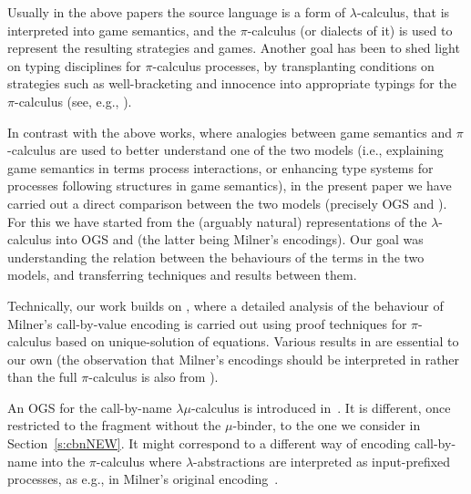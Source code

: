Usually in the above  papers
the source language is a form of $\lambda$-calculus, 
that is interpreted into game semantics,  
and the 
 $\pi$-calculus  (or dialects of it)  is used to
represent the resulting strategies and games. 
Another goal has been to shed light on typing
disciplines  for 
$\pi$-calculus processes, by transplanting conditions on strategies such as well-bracketing
and innocence into appropriate typings for the $\pi$-calculus (see, e.g., 
\cite{berger2001sequentiality,YBH11,HirschkoffPS21}). 


In contrast with the above works,  where analogies between game semantics and
$\pi$-calculus are used to better understand one of the two models 
(i.e., explaining  game semantics in terms process interactions,  or enhancing type systems for
processes following structures in game semantics), 
in the  present paper we have carried out a direct comparison between 
the two models (precisely OGS and \piI). 
For this we have started from
 the (arguably natural)  representations of the $\lambda$-calculus 
into OGS and \piI  (the latter being Milner's encodings).
Our goal was
understanding the  relation between  the behaviours of the terms in the
two models, and   transferring techniques and results between them.

Technically, our work  builds on
\cite{DurierHS18,Durier20}, where a  detailed analysis of the behaviour of Milner's
call-by-value encoding is carried out using proof techniques for
$\pi$-calculus based on unique-solution of equations.
Various results in \cite{DurierHS18,Durier20} are essential to our own
 (the observation that Milner's
encodings should be interpreted in \piI rather than the full $\pi$-calculus is also from
\cite{DurierHS18,Durier20}).

An OGS %
for the call-by-name $\lambda\mu$-calculus is introduced
in~\cite{DBLP:conf/fossacs/Laird20}. It 
 is different, once restricted to the fragment without the $\mu$-binder, to the one we
 consider in Section~\ref{s:cbnNEW}.  It might correspond  
 to a different way of encoding  call-by-name into the $\pi$-calculus
where $\lambda$-abstractions are interpreted as input-prefixed processes, as e.g., in 
 Milner's original encoding~\cite{Mil92s}.





